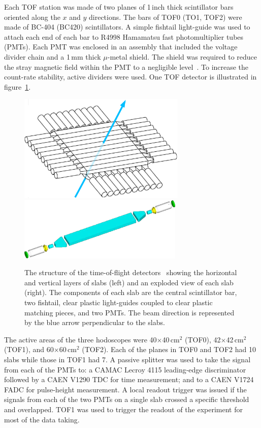 Each TOF station was made of two planes of 1\,inch thick scintillator
bars oriented along the $x$ and $y$ directions. 
The bars of TOF0 (TO1, TOF2) were made of BC-404 (BC420) scintillators.
A simple fishtail light-guide was used to attach each end of each bar
to R4998 Hamamatsu fast photomultiplier tubes (PMTs).
Each PMT was enclosed in an assembly that included the voltage divider
chain and a 1\,mm thick $\mu$-metal shield.
The shield was required to reduce the stray magnetic field within the
PMT to a negligible level~\cite{2010NIMPA.615...14B}.
To increase the count-rate stability, active dividers were used.
One TOF detector is illustrated in figure~\ref{fig:tof:schematic}.
\begin{figure}[!htb]
  \begin{center}
    \includegraphics[width=8cm]{tof_diagram2-with_beam}
    \includegraphics[height=3cm]{slab_design2}
  \end{center}
  \caption{
    The structure of the time-of-flight
    detectors~\cite{2010NIMPA.615...14B,NOTE145} showing the
    horizontal and vertical layers of slabs (left) and an exploded
    view of each slab (right). 
    The components of each slab are the central scintillator bar, two
    fishtail, clear plastic light-guides coupled to clear plastic
    matching pieces, and two PMTs.
    The beam direction is represented by the blue arrow perpendicular to the slabs.
  }
  \label{fig:tof:schematic}
\end{figure}

The active areas of the three hodoscopes were 40$\times$40\,cm$^2$
(TOF0), 42$\times$42\,cm$^2$ (TOF1), and 60$\times$60\,cm$^2$ (TOF2).
Each of the planes in TOF0 and TOF2 had 10 slabs while those in TOF1 had 7.
A passive splitter was used to take the signal from each of the PMTs
to: a CAMAC Lecroy 4115 leading-edge discriminator followed by a CAEN
V1290 TDC for time measurement; and to a CAEN V1724 FADC for
pulse-height measurement.
A local readout trigger was issued if the signals from each of the two
PMTs on a single slab crossed a specific threshold and overlapped.
TOF1 was used to trigger the readout of the experiment for most of the
data taking. \\

